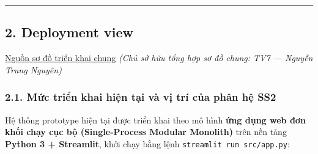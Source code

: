 \documentclass[11pt,a4paper]{article}
\begin{document}
\begin{center}\rule{0.5\linewidth}{0.5pt}\end{center}

\hypertarget{deployment-view}{%
\subsection{2. Deployment view}\label{deployment-view}}

\href{../../../diagrams/submission_3/shared/deployment.puml}{Nguồn sơ đồ
triển khai chung} \emph{(Chủ sở hữu tổng hợp sơ đồ chung: TV7 --- Nguyễn
Trung Nguyên)}

\hypertarget{mux1ee9c-triux1ec3n-khai-hiux1ec7n-tux1ea1i-vuxe0-vux1ecb-truxed-cux1ee7a-phuxe2n-hux1ec7-ss2}{%
\subsubsection{2.1. Mức triển khai hiện tại và vị trí của phân hệ
SS2}\label{mux1ee9c-triux1ec3n-khai-hiux1ec7n-tux1ea1i-vuxe0-vux1ecb-truxed-cux1ee7a-phuxe2n-hux1ec7-ss2}}

Hệ thống prototype hiện tại được triển khai theo mô hình \textbf{ứng
dụng web đơn khối chạy cục bộ (Single-Process Modular Monolith)} trên
nền tảng \textbf{Python 3 + Streamlit}, khởi chạy bằng lệnh
\texttt{streamlit\ run\ src/app.py}:
\end{document}
